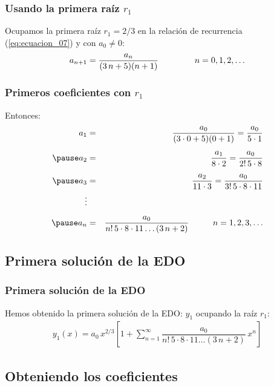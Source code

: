 \documentclass[12pt]{beamer}
\begin{document}
\begin{frame}
\frametitle{Usando la primera raíz $r_{1}$}
Ocupamos la primera raíz $r_{1} = 2/3$ en la relación de recurrencia (\ref{eq:ecuacion_07}) y con $a_{0} \neq 0$:
\begin{align}
a_{n+1} = \dfrac{a_{n}}{(3 \, n + 5)(n + 1)} \hspace{1.5cm} n = 0, 1, 2, \ldots
\label{eq:ecuacion_08}    
\end{align}
\end{frame}
\begin{frame}
\frametitle{Primeros coeficientes con $r_{1}$}
Entonces:
\begin{eqnarray*}
a_{1} &=& \dfrac{a_{0}}{(3 \cdot 0 + 5)(0 + 1)}  = \dfrac{a_{0}}{5 \cdot 1} \\[0.5em] \pause
a_{2} &=& \dfrac{a_{1}}{8 \cdot 2} = \dfrac{a_{0}}{2! \, 5 \cdot 8} \\[0.5em] \pause
a_{3} &=& \dfrac{a_{2}}{11 \cdot 3} = \dfrac{a_{0}}{3! \, 5 \cdot 8 \cdot 11} \\
\vdots \\[0.5em] \pause
a_{n} &=& \dfrac{a_{0}}{n! \, 5 \cdot 8 \cdot 11 \ldots (3\, n + 2)} \hspace{1cm} n = 1, 2, 3, \ldots
\end{eqnarray*}
\end{frame}

\subsection*{Primera solución de la EDO}

\begin{frame}
\frametitle{Primera solución de la EDO}
Hemos obtenido la primera solución de la EDO: $y_{1}$ ocupando la raíz $r_{1}$:
\begin{align}
y_{1}(x) = a_{0} \, x^{2/3} \left[ 1 + \sum_{n=1}^{\infty} \dfrac{a_{0}}{n! \, 5 \cdot 8 \cdot 11 \ldots (3\, n + 2)} \, x^{n} \right]
\label{eq:ecuacion_10}    
\end{align}
\end{frame}

\subsection*{Obteniendo los coeficientes}
\end{document}
